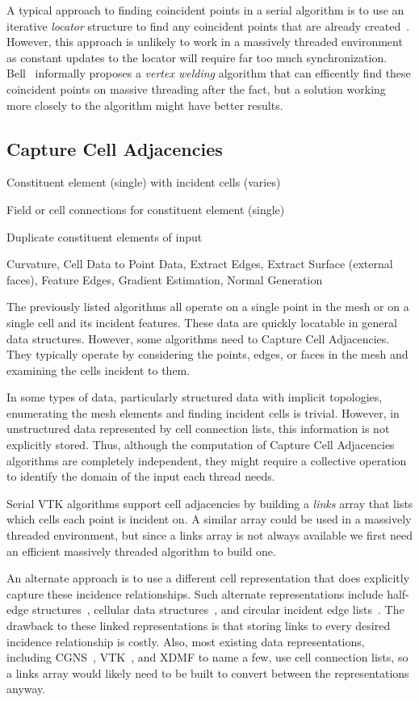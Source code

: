 \documentclass{sig-alternate}
\newcommand*{\lcite}[1]{~\cite{#1}}
\newcommand*{\scite}[1]{~\cite{#1}}
\newcommand*{\keyterm}[1]{\emph{#1}}
\newcommand{\algclass}[1]{\textsf{#1}}
\newcommand{\algorithmclasssection}[1]{\subsection*{#1}}
\newcommand{\algorithmclass}[5]{
  \algorithmclasssection{#1} %
  \begin{description}[leftmargin=9em,style=nextline,noitemsep]
    \raggedright
  \item[Input] #2
  \item[Output] #3
  \item[Interdependence] #4
  \item[Algorithms] #5
  \end{description}
}
\begin{document}
A typical approach to finding coincident points in a serial algorithm is to
use an iterative \keyterm{locator} structure to find any coincident points
that are already created\lcite{VTKUsersGuide}. However, this approach is
unlikely to work in a massively threaded environment as constant updates to
the locator will require far too much synchronization. Bell\scite{Bell2010}
informally proposes a \keyterm{vertex welding} algorithm that can
efficently find these coincident points on massive threading after the
fact, but a solution working more closely to the algorithm might have
better results.


\algorithmclass{Capture Cell Adjacencies}
               {Constituent element (single) with incident cells (varies)} %
               {Field or cell connections for constituent element (single)} %
               {Duplicate constituent elements of input} %
               {Curvature, Cell Data to Point Data, Extract Edges, Extract
                 Surface (external faces), Feature Edges, Gradient
                 Estimation, Normal Generation}

\noindent
The previously listed algorithms all operate on a single point in the mesh
or on a single cell and its incident features. These data are quickly
locatable in general data structures. However, some algorithms need to
\algclass{Capture Cell Adjacencies}. They typically operate by considering
the points, edges, or faces in the mesh and examining the cells incident to
them.

In some types of data, particularly structured data with implicit
topologies, enumerating the mesh elements and finding incident cells is
trivial. However, in unstructured data represented by cell connection
lists, this information is not explicitly stored. Thus, although the
computation of \algclass{Capture Cell Adjacencies} algorithms are
completely independent, they might require a collective operation to
identify the domain of the input each thread needs.

Serial VTK algorithms support cell adjacencies by building a
\keyterm{links} array that lists which cells each point is incident on. A
similar array could be used in a massively threaded environment, but since
a links array is not always available we first need an efficient massively
threaded algorithm to build one.

An alternate approach is to use a different cell representation that does
explicitly capture these incidence relationships. Such alternate
representations include half-edge structures\lcite{Kettner1998}, cellular
data structures\lcite{Alumbaugh2005}, and circular incident edge
lists\lcite{Levy2001}. The drawback to these linked representations is that
storing links to every desired incidence relationship is costly. Also, most
existing data representations, including CGNS\lcite{CGNS}, VTK\lcite{VTK},
and XDMF to name a few, use cell connection lists, so a links array would
likely need to be built to convert between the representations anyway.
\end{document}

